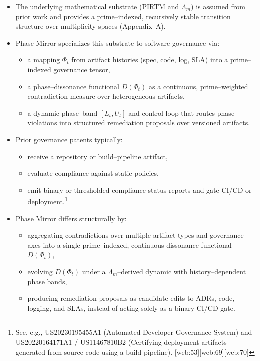 \documentclass[11pt]{article}
\begin{document}
\begin{itemize}
  \item The underlying mathematical substrate (PIRTM and $\Lambda_m$) is assumed from prior work and provides a prime--indexed, recursively stable transition structure over multiplicity spaces (Appendix~A).
  \item Phase Mirror specializes this substrate to software governance via:
  \begin{itemize}
    \item a mapping $\Phi_t$ from artifact histories (spec, code, log, SLA) into a prime--indexed governance tensor,
    \item a phase--dissonance functional $D(\Phi_t)$ as a continuous, prime--weighted contradiction measure over heterogeneous artifacts,
    \item a dynamic phase--band $[L_t,U_t]$ and control loop that routes phase violations into structured remediation proposals over versioned artifacts.
  \end{itemize}
  \item Prior governance patents typically:
  \begin{itemize}
    \item receive a repository or build--pipeline artifact,
    \item evaluate compliance against static policies,
    \item emit binary or thresholded compliance status reports and gate CI/CD or deployment.\footnote{See, e.g., US20230195455A1 (Automated Developer Governance System) and US20220164171A1 / US11467810B2 (Certifying deployment artifacts generated from source code using a build pipeline). [web:53][web:69][web:70]}
  \end{itemize}
  \item Phase Mirror differs structurally by:
  \begin{itemize}
    \item aggregating contradictions over multiple artifact types and governance axes into a single prime--indexed, continuous dissonance functional $D(\Phi_t)$,
    \item evolving $D(\Phi_t)$ under a $\Lambda_m$--derived dynamic with history--dependent phase bands,
    \item producing remediation proposals as candidate edits to ADRs, code, logging, and SLAs, instead of acting solely as a binary CI/CD gate.
  \end{itemize}
\end{itemize}
\end{document}
